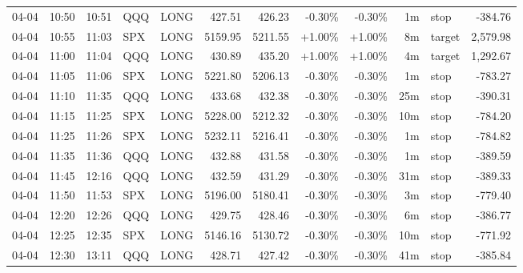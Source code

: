 \documentclass[11pt,a4paper,twoside]{article}
\begin{document}
\begin{center}
\begin{longtable}{>{\color{txtmain}}l l l l l r r r r r >{\color{txtmain}}l r}
04-04 & 10:50 & 10:51 & QQQ & LONG & 427.51 & 426.23 & \textcolor{lossred}{-0.30\%} & \textcolor{lossred}{-0.30\%} & 1m & stop & \textcolor{lossred}{-384.76} \\
04-04 & 10:55 & 11:03 & SPX & LONG & 5159.95 & 5211.55 & \textcolor{wingreen}{+1.00\%} & \textcolor{wingreen}{+1.00\%} & 8m & target & \textcolor{wingreen}{2,579.98} \\
04-04 & 11:00 & 11:04 & QQQ & LONG & 430.89 & 435.20 & \textcolor{wingreen}{+1.00\%} & \textcolor{wingreen}{+1.00\%} & 4m & target & \textcolor{wingreen}{1,292.67} \\
04-04 & 11:05 & 11:06 & SPX & LONG & 5221.80 & 5206.13 & \textcolor{lossred}{-0.30\%} & \textcolor{lossred}{-0.30\%} & 1m & stop & \textcolor{lossred}{-783.27} \\
04-04 & 11:10 & 11:35 & QQQ & LONG & 433.68 & 432.38 & \textcolor{lossred}{-0.30\%} & \textcolor{lossred}{-0.30\%} & 25m & stop & \textcolor{lossred}{-390.31} \\
04-04 & 11:15 & 11:25 & SPX & LONG & 5228.00 & 5212.32 & \textcolor{lossred}{-0.30\%} & \textcolor{lossred}{-0.30\%} & 10m & stop & \textcolor{lossred}{-784.20} \\
04-04 & 11:25 & 11:26 & SPX & LONG & 5232.11 & 5216.41 & \textcolor{lossred}{-0.30\%} & \textcolor{lossred}{-0.30\%} & 1m & stop & \textcolor{lossred}{-784.82} \\
04-04 & 11:35 & 11:36 & QQQ & LONG & 432.88 & 431.58 & \textcolor{lossred}{-0.30\%} & \textcolor{lossred}{-0.30\%} & 1m & stop & \textcolor{lossred}{-389.59} \\
04-04 & 11:45 & 12:16 & QQQ & LONG & 432.59 & 431.29 & \textcolor{lossred}{-0.30\%} & \textcolor{lossred}{-0.30\%} & 31m & stop & \textcolor{lossred}{-389.33} \\
04-04 & 11:50 & 11:53 & SPX & LONG & 5196.00 & 5180.41 & \textcolor{lossred}{-0.30\%} & \textcolor{lossred}{-0.30\%} & 3m & stop & \textcolor{lossred}{-779.40} \\
04-04 & 12:20 & 12:26 & QQQ & LONG & 429.75 & 428.46 & \textcolor{lossred}{-0.30\%} & \textcolor{lossred}{-0.30\%} & 6m & stop & \textcolor{lossred}{-386.77} \\
04-04 & 12:25 & 12:35 & SPX & LONG & 5146.16 & 5130.72 & \textcolor{lossred}{-0.30\%} & \textcolor{lossred}{-0.30\%} & 10m & stop & \textcolor{lossred}{-771.92} \\
04-04 & 12:30 & 13:11 & QQQ & LONG & 428.71 & 427.42 & \textcolor{lossred}{-0.30\%} & \textcolor{lossred}{-0.30\%} & 41m & stop & \textcolor{lossred}{-385.84} \\

\end{longtable}
\end{center}
\end{document}
